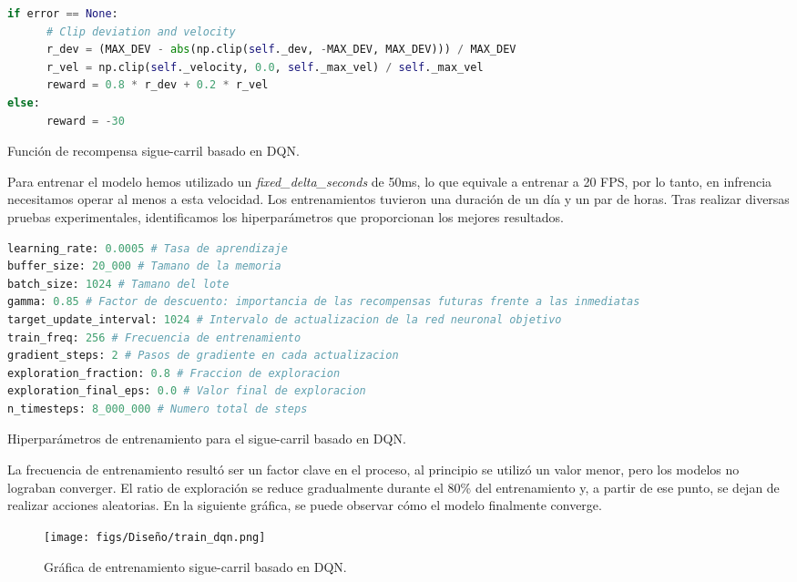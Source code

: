 \begin{code}[h]
\begin{lstlisting}[language=Python]
if error == None:
      # Clip deviation and velocity
      r_dev = (MAX_DEV - abs(np.clip(self._dev, -MAX_DEV, MAX_DEV))) / MAX_DEV
      r_vel = np.clip(self._velocity, 0.0, self._max_vel) / self._max_vel
      reward = 0.8 * r_dev + 0.2 * r_vel
else:
      reward = -30
\end{lstlisting}
\caption[Función de recompensa sigue-carril basado en \ac{DQN}]{Función de recompensa sigue-carril basado en \ac{DQN}.}
\label{cod:rew_dqn}
\end{code}

Para entrenar el modelo hemos utilizado un \textit{fixed\_delta\_seconds} de 50ms, lo que equivale a entrenar a 20 FPS, por lo tanto, en infrencia necesitamos operar al menos a esta velocidad. Los entrenamientos tuvieron una duración de un día y un par de horas. Tras realizar diversas pruebas experimentales, identificamos los hiperparámetros que proporcionan los mejores resultados. 
\begin{code}[h]
\begin{lstlisting}[language=Python]
learning_rate: 0.0005 # Tasa de aprendizaje
buffer_size: 20_000 # Tamano de la memoria
batch_size: 1024 # Tamano del lote
gamma: 0.85 # Factor de descuento: importancia de las recompensas futuras frente a las inmediatas
target_update_interval: 1024 # Intervalo de actualizacion de la red neuronal objetivo
train_freq: 256 # Frecuencia de entrenamiento
gradient_steps: 2 # Pasos de gradiente en cada actualizacion
exploration_fraction: 0.8 # Fraccion de exploracion
exploration_final_eps: 0.0 # Valor final de exploracion
n_timesteps: 8_000_000 # Numero total de steps

\end{lstlisting}
\caption[Hiperparámetros de entrenamiento para el sigue-carril basado en \ac{DQN}]{Hiperparámetros de entrenamiento para el sigue-carril basado en \ac{DQN}.}
\label{cod:hiper_params_dqn}
\end{code}

La frecuencia de entrenamiento resultó ser un factor clave en el proceso, al principio se utilizó un valor menor, pero los modelos no lograban converger. El ratio de exploración se reduce gradualmente durante el 80\% del entrenamiento y, a partir de ese punto, se dejan de realizar acciones aleatorias. En la siguiente gráfica, se puede observar cómo el modelo finalmente converge.
\begin{figure}[ht]
  \centering
  \texttt{[image: figs/Diseño/train\_dqn.png]}
  \caption{Gráfica de entrenamiento sigue-carril basado en \ac{DQN}.}
  \label{fig:train_dqn}
\end{figure}

